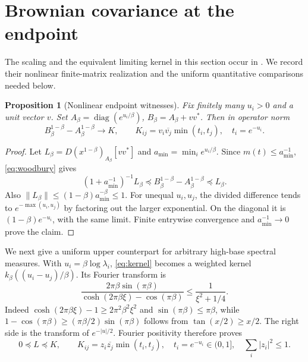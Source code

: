 \documentclass[11pt]{article}
\newtheorem{proposition}[theorem]{Proposition}
\numberwithin{equation}{section}
\newcommand{\diag}{\operatorname{diag}}
\begin{document}
\section{Brownian covariance at the endpoint}

The scaling and the equivalent limiting kernel in this section occur
in \cite[Remark~5.3]{Ricard}. We record their nonlinear finite-matrix
realization and the uniform quantitative comparisons needed below.

\begin{proposition}[Nonlinear endpoint witnesses]\label{prop:brownianlimit}
Fix finitely many $u_i>0$ and a unit vector $v$. Set
$A_\beta=\diag(e^{u_i/\beta})$, $B_\beta=A_\beta+vv^*$.
Then in operator norm
\begin{equation}\label{eq:brownianlimit}
 B_\beta^{1-\beta}-A_\beta^{1-\beta}\longrightarrow K,
 \qquad K_{ij}=v_i\overline{v_j}\min(t_i,t_j),\quad t_i=e^{-u_i}.
\end{equation}
\end{proposition}
\begin{proof}
Let $L_\beta=D(x^{1-\beta})_{A_\beta}[vv^*]$ and
$a_{\min}=\min_i e^{u_i/\beta}$. Since $m(t)\le a_{\min}^{-1}$,
\eqref{eq:woodbury} gives
\[
 (1+a_{\min}^{-1})^{-1}L_\beta
 \preceq B_\beta^{1-\beta}-A_\beta^{1-\beta}\preceq L_\beta.
\]
Also $\|L_\beta\|\le(1-\beta)a_{\min}^{-\beta}\le1$.
For unequal $u_i,u_j$, the divided difference tends to
$e^{-\max(u_i,u_j)}$ by factoring out the larger exponential.
On the diagonal it is $(1-\beta)e^{-u_i}$, with the same limit.
Finite entrywise convergence and $a_{\min}^{-1}\to0$ prove the claim.
\end{proof}

We next give a uniform upper counterpart for arbitrary high-base
spectral measures. With $u_i=\beta\log\lambda_i$,
\eqref{eq:kernel} becomes a weighted kernel
$k_\beta((u_i-u_j)/\beta)$. Its Fourier transform is
\begin{equation}\label{eq:scaledtransform}
 \frac{2\pi\beta\sin(\pi\beta)}
              {\cosh(2\pi\beta\xi)-\cos(\pi\beta)}
       \le\frac1{\xi^2+1/4}.
\end{equation}
Indeed $\cosh(2\pi\beta\xi)-1\ge2\pi^2\beta^2\xi^2$
and $\sin(\pi\beta)\le\pi\beta$, while
$1-\cos(\pi\beta)\ge(\pi\beta/2)\sin(\pi\beta)$ follows from
$\tan(x/2)\ge x/2$. The right side is the transform of
$e^{-|u|/2}$. Fourier positivity therefore proves
\begin{equation}\label{eq:browniandom}
 0\preceq L\preceq K,\qquad
 K_{ij}=z_i\overline{z_j}\min(t_i,t_j),\quad t_i=e^{-u_i}\in(0,1],
 \quad\sum_i|z_i|^2\le1.
\end{equation}
\end{document}
